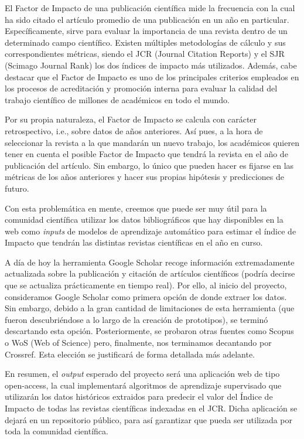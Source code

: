 
El Factor de Impacto de una publicación científica mide la frecuencia con la cual ha sido citado el artículo promedio de una publicación en un año en particular. Específicamente, sirve para evaluar la importancia de una revista dentro de un determinado campo científico. Existen múltiples metodologías de cálculo y sus correspondientes métricas, siendo el JCR (Journal Citation Reports) y el SJR (Scimago Journal Rank) los dos índices de impacto más utilizados.
Además, cabe destacar que el Factor de Impacto es uno de los principales criterios empleados en los procesos de acreditación y promoción interna para evaluar la calidad del trabajo científico de millones de académicos en todo el mundo.

Por su propia naturaleza, el Factor de Impacto se calcula con carácter retrospectivo, i.e., sobre datos de años anteriores. Así pues, a la hora de seleccionar la revista a la que mandarán un nuevo trabajo, los académicos quieren tener en cuenta el posible Factor de Impacto que tendrá la revista en el año de publicación del artículo. Sin embargo, lo único que pueden hacer es fijarse en las métricas de los años anteriores y hacer sus propias hipótesis y predicciones de futuro.

Con esta problemática en mente, creemos que puede ser muy útil para la comunidad científica utilizar los datos bibliográficos que hay disponibles en la web como \textit{inputs} de modelos de aprendizaje automático para estimar el índice de Impacto que tendrán las distintas revistas científicas en el año en curso.

A día de hoy la herramienta Google Scholar recoge información extremadamente actualizada sobre la publicación y citación de artículos científicos (podría decirse que se actualiza prácticamente en tiempo real). Por ello, al inicio del proyecto, consideramos Google Scholar como primera opción de donde extraer los datos. Sin embargo, debido a la gran cantidad de limitaciones de esta herramienta (que fueron descubriéndose a lo largo de la creación de prototipos), se terminó descartando esta opción. Posteriormente, se probaron otras fuentes como Scopus o WoS (Web of Science) pero, finalmente, nos terminamos decantando por Crossref. Esta elección se justificará de forma detallada más adelante.

En resumen, el \textit{output} esperado del proyecto será una aplicación web de tipo open-access, la cual implementará algoritmos de aprendizaje supervisado que utilizarán los datos históricos extraidos para predecir el valor del Índice de Impacto de todas las revistas científicas indexadas en el JCR. Dicha aplicación se dejará en un repositorio público, para así garantizar que pueda ser utilizada por toda la comunidad científica. 
